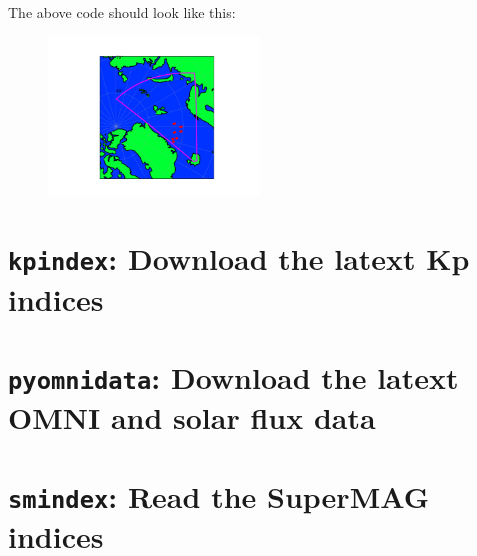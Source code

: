 				The above code should look like this:
			
				\begin{figure}
					\centering\includegraphics[width=0.5\textwidth]{figures/ch05_sdfov.png}
				\end{figure}
			


	\section{\texttt{kpindex}: Download the latext Kp indices}

	\section{\texttt{pyomnidata}: Download the latext OMNI and solar flux data}

	\section{\texttt{smindex}: Read the SuperMAG indices}




